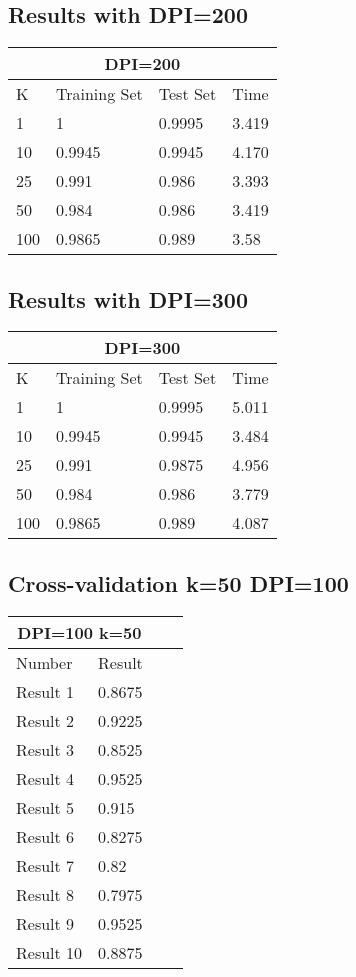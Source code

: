 \documentclass[paper=a4, fontsize=11pt]{scrartcl} %
\numberwithin{equation}{section} %
\numberwithin{figure}{section} %
\numberwithin{table}{section} %
\begin{document}
\subsection*{Results with DPI=200}
\begin{tabular}{ |p{3cm}|p{3cm}|p{3cm}|p{3cm}|  }
 \hline
 \multicolumn{4}{|c|}{DPI=200} \\
 \hline
 K & Training Set & Test Set & Time\\
 \hline
 1 & 1 & 0.9995 & 3.419\\
 10 & 0.9945 & 0.9945 & 4.170\\
 25 & 0.991 & 0.986 & 3.393\\
 50 & 0.984 & 0.986 & 3.419\\
 100 & 0.9865 & 0.989 & 3.58\\
 \hline
\end{tabular}

\subsection*{Results with DPI=300}
\begin{tabular}{ |p{3cm}|p{3cm}|p{3cm}|p{3cm}|  }
 \hline
 \multicolumn{4}{|c|}{DPI=300} \\
 \hline
 K & Training Set & Test Set & Time\\
 \hline
 1 & 1 & 0.9995 & 5.011\\
 10 & 0.9945 & 0.9945 & 3.484\\
 25 & 0.991 & 0.9875 & 4.956\\
 50 & 0.984 & 0.986 & 3.779\\
 100 & 0.9865 & 0.989 & 4.087\\
 \hline
\end{tabular}

\subsection*{Cross-validation k=50 DPI=100}
\begin{center}
\begin{tabular}{ |p{3cm}|p{3cm}|p{3cm}|p{3cm}|  }
 \hline
 \multicolumn{2}{|c|}{DPI=100 k=50} \\
 \hline
 Number & Result\\
 \hline
 Result 1 & 0.8675 \\
 Result 2 & 0.9225 \\
 Result 3 & 0.8525 \\
 Result 4 & 0.9525\\ 
 Result 5 & 0.915 \\
 Result 6 & 0.8275 \\
 Result 7 & 0.82 \\
 Result 8 & 0.7975 \\
 Result 9 & 0.9525 \\
 Result 10 & 0.8875\\
 \hline
\end{tabular}
\end{center}
\end{document}
